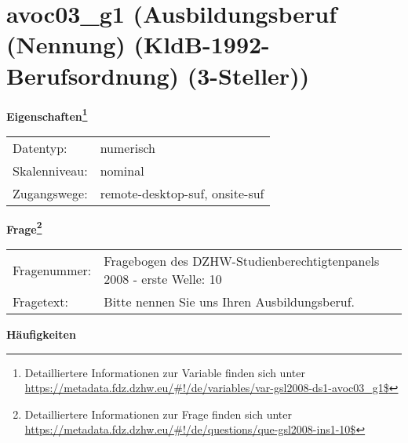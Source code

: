 
    \setcounter{footnote}{0}

    \vspace*{-1.8cm}
	\section{avoc03\_g1 (Ausbildungsberuf (Nennung) (KldB-1992-Berufsordnung) (3-Steller))}
	\label{section:avoc03_g1}



    \vspace*{0.5cm}
    \noindent\textbf{Eigenschaften\footnote{Detailliertere Informationen zur Variable finden sich unter
		\url{https://metadata.fdz.dzhw.eu/\#!/de/variables/var-gsl2008-ds1-avoc03_g1$}}}\\
	\begin{tabularx}{\hsize}{@{}lX}
	Datentyp: & numerisch \\
	Skalenniveau: & nominal \\
	Zugangswege: &
	  remote-desktop-suf, 
	  onsite-suf
 \\
    \end{tabularx}



				\vspace*{0.5cm}
                \noindent\textbf{Frage\footnote{Detailliertere Informationen zur Frage finden sich unter
		              \url{https://metadata.fdz.dzhw.eu/\#!/de/questions/que-gsl2008-ins1-10$}}}\\
				\begin{tabularx}{\hsize}{@{}lX}
					Fragenummer: &
					  Fragebogen des DZHW-Studienberechtigtenpanels 2008 - erste Welle:
					  10
 \\
					Fragetext: & Bitte nennen Sie uns Ihren Ausbildungsberuf. \\
				\end{tabularx}





        		\vspace*{0.5cm}
                \noindent\textbf{Häufigkeiten}

